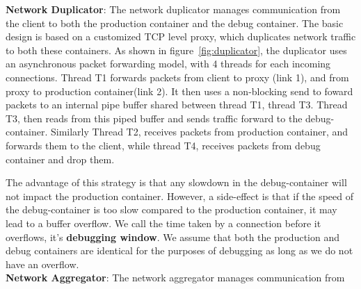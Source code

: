\iffalse	
	\begin{figure}[ht]
		\begin{centering}
			\texttt{[image: figs/network\_dup.pdf]}
			\caption{Description of the Network Duplicator. In \textit{synchronized} mode: Thread 1 executes steps [1,3,5], and Thread 2 executes [2,4,6] sequentially. In \textit{asynchronous} mode: Thread 1 executes steps [1,3], Thread 2 executes [2,4], Thread 3 executes [5], and Thread 4 executes [6]}
			\label{fig:duplicator}
		\end{centering}
	\end{figure}
\fi
 \textbf{Network Duplicator}: The network duplicator manages communication from the client to both the production container and the debug container.
The basic design is based on a customized TCP level proxy, which duplicates network traffic to both these containers.
As shown in figure~\ref{fig:duplicator}, the duplicator uses an asynchronous packet forwarding model, with 4 threads for each incoming connections.
Thread T1 forwards packets from client to proxy (link 1), and from proxy to production container(link 2). It then uses a non-blocking send to foward packets to an internal pipe buffer shared between thread T1, thread T3. Thread T3, then reads from this piped buffer and sends traffic forward to the debug-container. 
Similarly Thread T2, receives packets from production container, and forwards them to the client, while thread T4, receives packets from debug container and drop them. 

The advantage of this strategy is that any slowdown in the debug-container will not impact the production container.
However, a side-effect is that if the speed of the debug-container is too slow compared to the production container, it may lead to a buffer overflow. 
We call the time taken by a connection before it overflows, it's \textbf{debugging window}.
We assume that both the production and debug containers are identical for the purposes of debugging as long as we do not have an overflow. \\

\textbf{Network Aggregator}: The network aggregator manages communication from 
	

